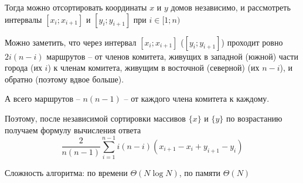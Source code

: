 \documentclass[12pt,a4paper]{article}
\begin{document}
    Тогда можно отсортировать координаты $x$ и $y$ домов независимо, и рассмотреть интервалы
    $[x_i;x_{i+1}]$ и $[y_i;y_{i+1}]$ при $i\in[1;n)$

    Можно заметить, что через интервал $[x_i;x_{i+1}]$ ($[y_i;y_{i+1}]$) проходит ровно
    $2i(n-i)$ маршрутов -- от членов комитета, живущих в западной (южной) части города (их $i$) к членам комитета,
    живущим в восточной (северной) (их $n-i$), и обратно (поэтому вдвое больше).

    А всего маршрутов -- $n(n-1)$ -- от каждого члена комитета к каждому.

    Поэтому, после независимой сортировки массивов $\{x\}$ и $\{y\}$ по возрастанию получаем формулу вычисления ответа
    \[ \frac{2}{n(n-1)} \sum_{i=1}^{n-1} i(n-i) \left( x_{i+1}-x_i + y_{i+1}-y_i \right) \]

    Сложность алгоритма: по времени $\Theta(N\log N)$, по памяти $\Theta(N)$
\end{document}

